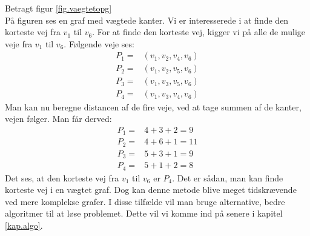 \begin{exmp}
Betragt figur \ref{fig.vaegtetopg} \\

På figuren ses en graf med vægtede kanter. Vi er interesserede i at finde den korteste vej fra $v_1$ til $v_6$. For at finde den korteste vej, kigger vi på alle de mulige veje fra $v_1$ til $v_6$.
Følgende veje ses:
\begin{align*}
	P_1=&(v_1,v_2,v_4,v_6)\\
	P_2=&(v_1,v_2,v_5,v_6)\\
	P_3=&(v_1,v_3,v_5,v_6)\\
	P_4=&(v_1,v_3,v_4,v_6)
\end{align*}
Man kan nu beregne distancen af de fire veje, ved at tage summen af de kanter, vejen følger. Man får derved:
\begin{align*}
	P_1=&4+3+2=9\\
	P_2=&4+6+1=11\\
	P_3=&5+3+1=9\\
	P_4=&5+1+2=8
\end{align*}
Det ses, at den korteste vej fra $v_1$ til $v_6$ er $P_4$. 
Det er sådan, man kan finde korteste vej i en vægtet graf. Dog kan denne metode blive meget tidskrævende ved mere komplekse grafer. I disse tilfælde vil man bruge alternative, bedre algoritmer til at løse problemet. Dette vil vi komme ind på senere i kapitel \ref{kap.algo}.
\end{exmp}
